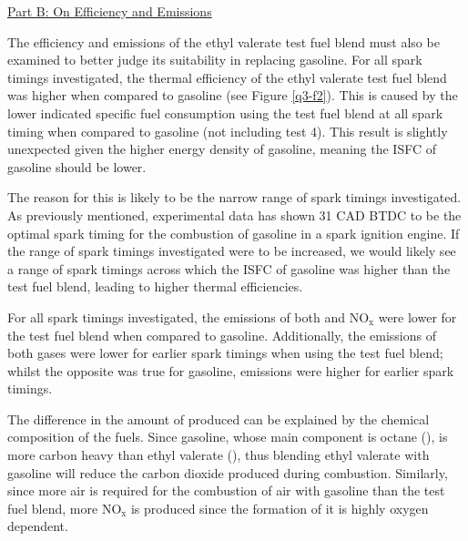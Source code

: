 \documentclass[11pt]{article}
\begin{document}
{\centering
  \underline{Part B: On Efficiency and Emissions}\par
}
The efficiency and emissions of the ethyl valerate test fuel blend must also be examined to better judge its suitability in replacing gasoline. For all spark timings investigated, the thermal efficiency of the ethyl valerate test fuel blend was higher when compared to gasoline (see Figure \ref{q3-f2}). This is caused by the lower indicated specific fuel consumption using the test fuel blend at all spark timing when compared to gasoline (not including test 4). This result is slightly unexpected given the higher energy density of gasoline, meaning the ISFC of gasoline should be lower.

The reason for this is likely to be the narrow range of spark timings investigated. As previously mentioned, experimental data has shown 31 CAD BTDC to be the optimal spark timing for the combustion of gasoline in a spark ignition engine. If the range of spark timings investigated were to be increased, we would likely see a range of spark timings across which the ISFC of gasoline was higher than the test fuel blend, leading to higher thermal efficiencies. 

For all spark timings investigated, the emissions of both  and $\text{NO}_{\text{x}}$ were lower for the test fuel blend when compared to gasoline. Additionally, the emissions of both gases were lower for earlier spark timings when using the test fuel blend; whilst the opposite was true for gasoline, emissions were higher for earlier spark timings.

The difference in the amount of  produced can be explained by the chemical composition of the fuels. Since gasoline, whose main component is octane (), is more carbon heavy than ethyl valerate (), thus blending ethyl valerate with gasoline will reduce the carbon dioxide produced during combustion. Similarly, since more air is required for the combustion of air with gasoline than the test fuel blend, more $\text{NO}_{\text{x}}$ is produced since the formation of it is highly oxygen dependent. 
\end{document}
